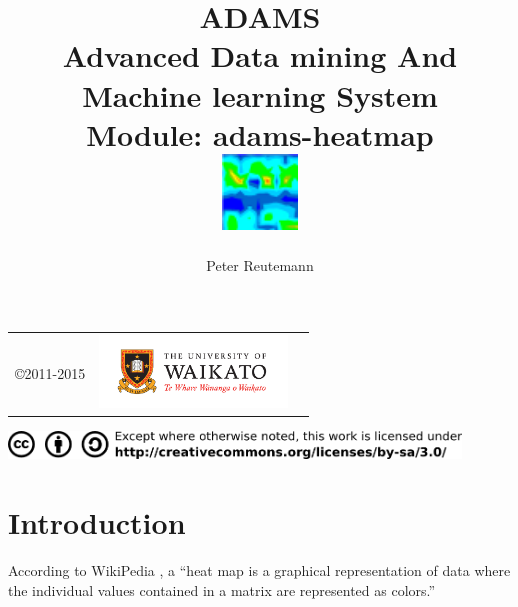 \documentclass[a4paper]{book}
\title{
  \textbf{ADAMS} \\
  {\Large \textbf{A}dvanced \textbf{D}ata mining \textbf{A}nd \textbf{M}achine
  learning \textbf{S}ystem} \\
  {\Large Module: adams-heatmap} \\
  \vspace{1cm}
  \includegraphics[width=2cm]{images/heatmap-module.png} \\
}
\author{
  Peter Reutemann
}
\begin{document}
\begin{titlepage}
\maketitle

\thispagestyle{empty}
\center
\begin{table}[b]
	\begin{tabular}{c l l}
		\parbox[c][2cm]{2cm}{\copyright 2011-2015} &
		\parbox[c][2cm]{5cm}{\includegraphics[width=5cm]{images/coat_of_arms.pdf}} \\
	\end{tabular}
	\includegraphics[width=12cm]{images/cc.png} \\
\end{table}

\end{titlepage}

\tableofcontents
\listoffigures

\chapter{Introduction}
According to WikiPedia \cite{heatmap}, a ``heat map is a graphical representation of data 
where the individual values contained in a matrix are represented as 
colors.''

\end{document}
